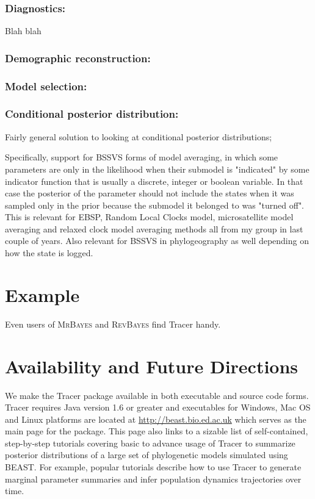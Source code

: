 \documentclass{bioinfo}
\begin{document}
\subsubsection*{Diagnostics:} Blah blah 

\subsubsection*{Demographic reconstruction:} 

\subsubsection*{Model selection:}


\subsubsection*{Conditional posterior distribution:}

Fairly general solution to looking at conditional posterior distributions;

Specifically, support for BSSVS forms of model averaging, in which some parameters are only in the likelihood when their submodel is "indicated" by some indicator function that is usually a discrete, integer or boolean variable. In that case the posterior of the parameter should not include the states when it was sampled only in the prior because the submodel it belonged to was "turned off". This is relevant for EBSP, Random Local Clocks model, microsatellite model averaging and relaxed clock model averaging methods all from my group in last couple of years. Also relevant for BSSVS in phylogeography as well depending on how the state is logged.


\section*{Example}

Even users of \textsc{MrBayes} and \textsc{RevBayes} find Tracer handy.  

\section*{Availability and Future Directions}

We make the Tracer package available in both executable and source code forms.  Tracer requires Java version 1.6 or greater and executables for Windows, Mac OS and Linux platforms are located at \url{http://beast.bio.ed.ac.uk} which serves as the main page for the package. This page also links to a sizable list of self-contained, step-by-step tutorials covering basic to advance usage of Tracer to summarize posterior distributions of a large set of phylogenetic models simulated using BEAST.  For example, popular tutorials describe how to use Tracer to generate marginal parameter summaries and infer population dynamics trajectories over time.
\end{document}
